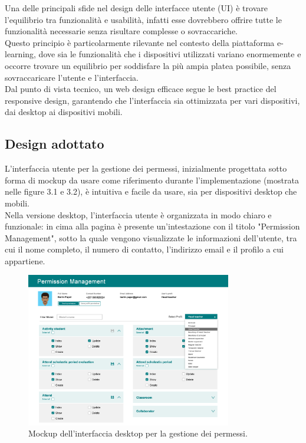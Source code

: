 \documentclass[a4paper, 12pt]{book}
\begin{document}
Una delle principali sfide nel design delle interfacce utente (UI) è trovare l'equilibrio tra funzionalità e
usabilità, infatti esse dovrebbero offrire tutte le funzionalità necessarie senza risultare complesse o sovraccariche.\\

Questo principio è particolarmente rilevante nel contesto della piattaforma e-learning, dove sia le funzionalità che
i dispositivi utilizzati variano enormemente e occorre trovare un equilibrio per soddisfare la più ampia
platea possibile, senza sovraccaricare l'utente e l'interfaccia.\\

Dal punto di vista tecnico, un web design efficace segue le best practice del responsive design, garantendo che
l'interfaccia sia ottimizzata per vari dispositivi, dai desktop ai dispositivi mobili.

\subsection{Design adottato}

L'interfaccia utente per la gestione dei permessi, inizialmente progettata sotto forma di mockup
da usare come riferimento durante l'implementazione (mostrata nelle figure 3.1 e 3.2), è intuitiva e facile da usare,
sia per dispositivi desktop che mobili.\\

Nella versione desktop, l'interfaccia utente è organizzata in modo chiaro e funzionale: in cima
alla pagina è presente un'intestazione con il titolo "Permission Management", sotto la quale vengono
visualizzate le informazioni dell'utente, tra cui il nome completo, il numero di contatto, l'indirizzo email e il
profilo a cui appartiene.\\

\begin{figure}[H]
  \centering
  \includegraphics[width=0.8\textwidth]{../images/permission-management-desktop-mockup.jpg}
  \caption{Mockup dell'interfaccia desktop per la gestione dei permessi.}
  \label{fig:desktop-mockup}
\end{figure}
\end{document}
